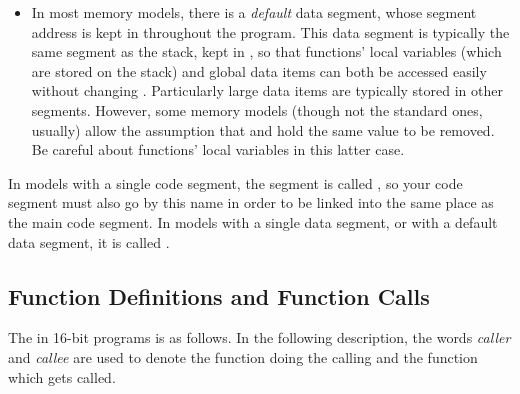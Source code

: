 \begin{itemize}
    \item{In most memory models, there is a \emph{default} data segment, whose
        segment address is kept in  throughout the program. This data
        segment is typically the same segment as the stack, kept in ,
        so that functions' local variables (which are stored on the stack)
        and global data items can both be accessed easily without changing
        . Particularly large data items are typically stored in other
        segments. However, some memory models (though not the standard
        ones, usually) allow the assumption that  and  hold the
        same value to be removed. Be careful about functions' local
        variables in this latter case.}
\end{itemize}

In models with a single code segment, the segment is called ,
so your code segment must also go by this name in order to be linked into the
same place as the main code segment. In models with a single data segment,
or with a default data segment, it is called .

\subsection{Function Definitions and Function Calls}
\label{subsec:16cfunc}

The 
in 16-bit programs is as follows. In the following description, the
words \emph{caller} and \emph{callee} are used to denote the function
doing the calling and the function which gets called.

